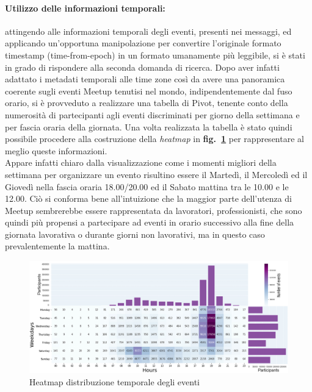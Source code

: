 \documentclass[fleqn,10pt]{SelfArx} %
\begin{document}
{\paragraph{Utilizzo delle informazioni temporali:}
attingendo alle informazioni temporali degli eventi, presenti nei messaggi, ed applicando un'opportuna manipolazione per convertire l'originale formato timestamp (time-from-epoch) in un formato umanamente più leggibile, si è stati in grado di rispondere alla seconda domanda di ricerca. 
Dopo aver infatti adattato i metadati temporali alle time zone così da avere una panoramica coerente sugli eventi Meetup tenutisi nel mondo, indipendentemente dal fuso orario, si è provveduto a realizzare una tabella di Pivot, tenente conto della numerosità di partecipanti agli eventi discriminati per giorno della settimana e per fascia oraria della giornata. 
Una volta realizzata la tabella è stato quindi possibile procedere alla costruzione della \textit{heatmap} in \textbf{fig.~\ref{plot_heatmap}} 
per rappresentare al meglio queste informazioni. \\
Appare infatti chiaro dalla visualizzazione come i momenti migliori della settimana per organizzare un evento risultino essere il Martedì, il Mercoledì ed il Giovedì nella fascia oraria 18.00/20.00 ed il Sabato mattina tra le 10.00 e le 12.00. 
Ciò si conforma bene all'intuizione che la maggior parte dell'utenza di Meetup sembrerebbe essere rappresentata da lavoratori, professionisti, che sono quindi più propensi a partecipare ad eventi in orario successivo alla fine della giornata lavorativa o durante giorni non lavorativi, ma in questo caso prevalentemente la mattina.
\begin{figure}
\centering
\includegraphics[width = 9.2 cm, height = 5 cm]{heatmap_with_barplot_v3.jpg}
\vspace*{0.01cm}
\caption{\footnotesize \label{plot_heatmap} Heatmap distribuzione temporale degli eventi}
\end{figure}
}
\end{document}
